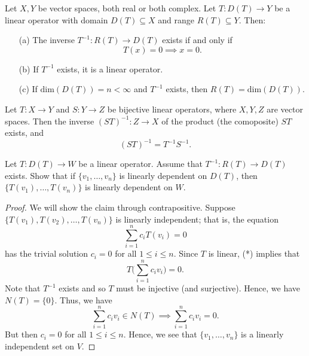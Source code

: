 \documentclass[a4paper]{article}
\begin{document}
\begin{theorem}
    Let \( X , Y  \) be vector spaces, both real or both complex. Let \( T : D(T) \to Y  \) be  a linear operator with domain \( D(T) \subseteq  X  \) and range \( R(T) \subseteq  Y  \). Then: 
    \begin{enumerate}
        \item[(a)] The inverse \( T^{-1}: R(T) \to D(T) \) exists if and only if
            \[  T(x) = 0 \implies x = 0.  \]
        \item[(b)] If \( T^{-1} \) exists, it is a linear operator.
        \item[(c)] If \( \text{dim}(D(T)) = n < \infty  \) and \( T^{-1} \) exists, then \( R(T) = \text{dim}(D(T)) \).
    \end{enumerate}
\end{theorem}

\begin{lemma}
   Let \( T: X \to Y  \) and \( S: Y \to Z  \) be bijective linear operators, where \( X,Y,Z \) are vector spaces. Then the inverse \( (ST)^{-1} : Z \to X  \) of the product (the comoposite) \( ST \) exists, and  
   \[  (ST)^{-1} = T^{-1} S^{-1}. \]
\end{lemma}


\begin{problem}[i]
         Let \( T : D(T) \to W  \) be a linear operator. Assume that \( T^{-1} : R(T) \to D(T) \) exists. Show that if \( \{ {v}_{1}, \dots, {v}_{n} \}  \) is linearly dependent on \( D(T) \), then \( \{ T ({v}_{1}), \dots, T ({v}_{n}) \}  \) is linearly dependent on \( W  \).
\end{problem}
\begin{proof}
We will show the claim through contrapositive. Suppose \( \{ T({v}_{1}), T({v}_{2}), \dots, T({v}_{n}) \}  \) is linearly independent; that is, the equation
\[  \sum_{ i=1  }^{ n } {c}_{i} T({v}_{i}) = 0  \tag{*} \]
has the trivial solution \( {c}_{i} = 0   \) for all \( 1 \leq i \leq n  \). Since \( T  \) is linear, (*) implies that  
\[  T \Big(  \sum_{ i=1  }^{ n } {c}_{i} {v}_{i} \Big) = 0.  \]
Note that \( T^{-1} \) exists and so \( T  \) must be injective (and surjective). Hence, we have \( N(T) = \{ 0  \}  \). Thus, we have 
\[  \sum_{ i=1  }^{ n } {c}_{i} {v}_{i} \in N(T) \implies \sum_{ i=1  }^{ n } {c}_{i} {v}_{i} = 0.   \]
But then \( {c}_{i} = 0  \) for all \( 1 \leq i \leq n  \). Hence, we see that \( \{ {v}_{1} , \dots, {v}_{n} \}  \) is a linearly independent set on \( V  \).
\end{proof}
\end{document}
